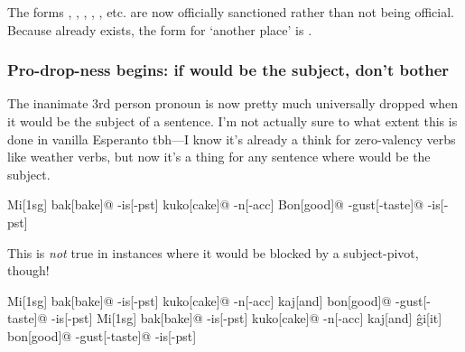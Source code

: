 The forms , , , ,  , etc. are now officially sanctioned rather than not being official. Because  already exists, the form for `another place' is .

\subsubsection{Pro-drop-ness begins: if  would be the subject, don't bother}

The inanimate 3rd person pronoun  is now pretty much universally dropped when it would be the subject of a sentence. I'm not actually sure to what extent this is done in vanilla Esperanto tbh---I know it's already a think for zero-valency verbs like weather verbs, but now it's a thing for any sentence where  would be the subject.

\ex
\begingl
\glpreamble {} \endpreamble
Mi[\sc 1sg]
bak[bake]@
-is[\sc -pst]
kuko[cake]@
-n[\sc -acc]
Bon[good]@
-gust[-taste]@
-is[\sc -pst]
\glft
{}
\endgl
\xe

This is \emph{not} true in instances where it would be blocked by a subject-pivot, though!

\pex
\a
\ljudge{\#}
\begingl
\glpreamble {} \endpreamble
Mi[\sc 1sg]
bak[bake]@
-is[\sc -pst]
kuko[cake]@
-n[\sc -acc]
kaj[and]
bon[good]@
-gust[-taste]@
-is[\sc -pst]
\glft
{}
\endgl
\a
\begingl
\glpreamble {} \endpreamble
Mi[\sc 1sg]
bak[bake]@
-is[\sc -pst]
kuko[cake]@
-n[\sc -acc]
kaj[and]
ĝi[it]
bon[good]@
-gust[-taste]@
-is[\sc -pst]
\glft
{}
\endgl
\xe